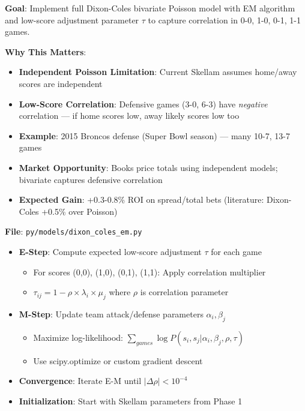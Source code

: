 
\textbf{Goal}: Implement full Dixon-Coles bivariate Poisson model with EM algorithm and low-score adjustment parameter $\tau$ to capture correlation in 0-0, 1-0, 0-1, 1-1 games.

\textbf{Why This Matters}:
\begin{itemize}
  \item \textbf{Independent Poisson Limitation}: Current Skellam assumes home/away scores are independent
  \item \textbf{Low-Score Correlation}: Defensive games (3-0, 6-3) have \textit{negative} correlation — if home scores low, away likely scores low too
  \item \textbf{Example}: 2015 Broncos defense (Super Bowl season) — many 10-7, 13-7 games
  \item \textbf{Market Opportunity}: Books price totals using independent models; bivariate captures defensive correlation
  \item \textbf{Expected Gain}: +0.3-0.8\% ROI on spread/total bets (literature: Dixon-Coles +0.5\% over Poisson)
\end{itemize}

\textbf{File}: \texttt{py/models/dixon\_coles\_em.py}

\begin{itemize}
  \item {} \textbf{E-Step}: Compute expected low-score adjustment $\tau$ for each game
  \begin{itemize}
    \item For scores (0,0), (1,0), (0,1), (1,1): Apply correlation multiplier
    \item $\tau_{ij} = 1 - \rho \times \lambda_i \times \mu_j$ where $\rho$ is correlation parameter
  \end{itemize}
  \item {} \textbf{M-Step}: Update team attack/defense parameters $\alpha_i, \beta_j$
  \begin{itemize}
    \item Maximize log-likelihood: $\sum_{games} \log P(s_i, s_j | \alpha_i, \beta_j, \rho, \tau)$
    \item Use scipy.optimize or custom gradient descent
  \end{itemize}
  \item {} \textbf{Convergence}: Iterate E-M until $|\Delta \rho| < 10^{-4}$
  \item {} \textbf{Initialization}: Start with Skellam parameters from Phase 1
\end{itemize}

